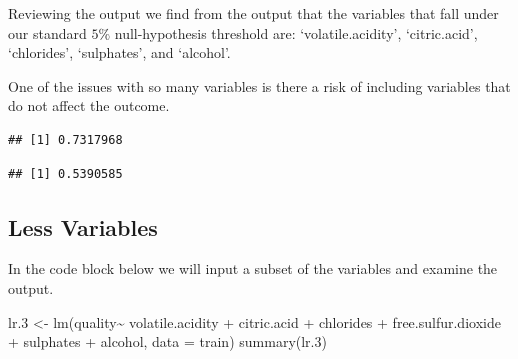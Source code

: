 \documentclass[
]{book}
\newenvironment{Shaded}{\begin{snugshade}}{\end{snugshade}}
\newcommand{\AttributeTok}[1]{\textcolor[rgb]{0.77,0.63,0.00}{#1}}
\newcommand{\FloatTok}[1]{\textcolor[rgb]{0.00,0.00,0.81}{#1}}
\newcommand{\FunctionTok}[1]{\textcolor[rgb]{0.00,0.00,0.00}{#1}}
\newcommand{\NormalTok}[1]{#1}
\newcommand{\OtherTok}[1]{\textcolor[rgb]{0.56,0.35,0.01}{#1}}
\newcommand{\SpecialCharTok}[1]{\textcolor[rgb]{0.00,0.00,0.00}{#1}}
\begin{document}
Reviewing the output we find from the output that the variables that fall under our standard \(5\%\) null-hypothesis threshold are: `volatile.acidity', `citric.acid', `chlorides', `sulphates', and `alcohol'.

One of the issues with so many variables is there a risk of including variables that do not affect the outcome.

\begin{Shaded}
\end{Shaded}

\begin{verbatim}
## [1] 0.7317968
\end{verbatim}

\begin{Shaded}
\end{Shaded}

\begin{verbatim}
## [1] 0.5390585
\end{verbatim}

\hypertarget{less-variables}{%
\subsection{Less Variables}\label{less-variables}}

In the code block below we will input a subset of the variables and examine the output.

\begin{Shaded}
\begin{Highlighting}[]
\NormalTok{lr}\FloatTok{.3} \OtherTok{\textless{}{-}} \FunctionTok{lm}\NormalTok{(quality}\SpecialCharTok{\textasciitilde{}}\NormalTok{ volatile.acidity }\SpecialCharTok{+}\NormalTok{ citric.acid }\SpecialCharTok{+}\NormalTok{ chlorides }\SpecialCharTok{+}\NormalTok{ free.sulfur.dioxide }\SpecialCharTok{+}\NormalTok{ sulphates }\SpecialCharTok{+}\NormalTok{ alcohol, }\AttributeTok{data =}\NormalTok{ train)}
\FunctionTok{summary}\NormalTok{(lr}\FloatTok{.3}\NormalTok{)}
\end{Highlighting}
\end{Shaded}
\end{document}
